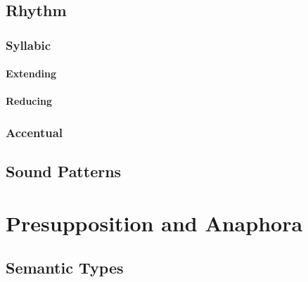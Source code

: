 \subsection{Rhythm}

\subsubsection{Syllabic}
\paragraph{Extending}
\paragraph{Reducing}

\subsubsection{Accentual}


\subsection{Sound Patterns}


\section{Presupposition and Anaphora}

\subsection{Semantic Types}




